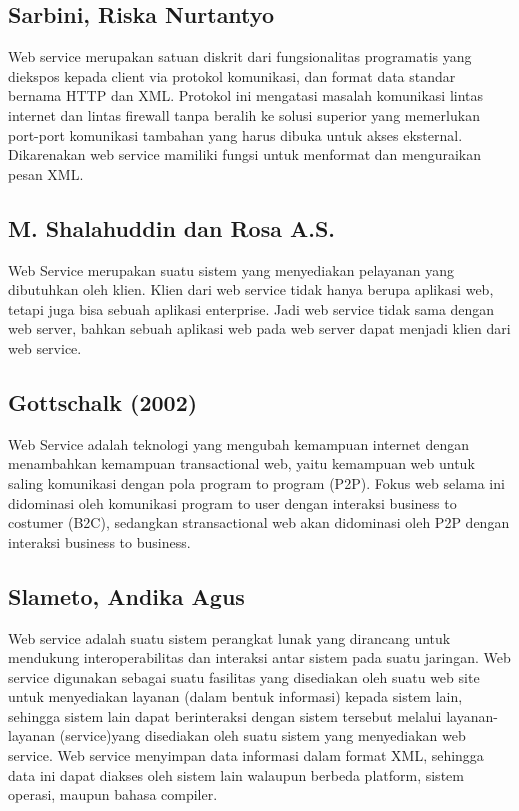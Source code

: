 \documentclass[12pt]{journal}
\begin{document}
\subsection{Sarbini, Riska Nurtantyo}

Web service merupakan satuan diskrit dari fungsionalitas programatis yang diekspos 
kepada client via protokol komunikasi, dan format data standar bernama HTTP dan 
XML. Protokol ini mengatasi masalah komunikasi lintas internet dan lintas 
firewall tanpa beralih ke solusi superior yang memerlukan port-port komunikasi 
tambahan yang harus dibuka untuk akses eksternal. Dikarenakan web service mamiliki fungsi untuk menformat dan menguraikan pesan XML\cite{sarbini2015pengembangan}. 

\subsection{M. Shalahuddin dan Rosa A.S.}

Web Service merupakan suatu sistem yang menyediakan pelayanan yang dibutuhkan oleh klien. Klien dari web service tidak hanya berupa aplikasi web, tetapi juga bisa sebuah aplikasi enterprise. Jadi web service tidak sama dengan web server, bahkan sebuah aplikasi web pada web server dapat menjadi klien dari web service\cite{inayah2014aplikasi}.

\subsection{Gottschalk (2002)}

Web Service adalah teknologi yang mengubah kemampuan internet dengan menambahkan kemampuan transactional web, yaitu kemampuan web untuk saling komunikasi dengan pola program to program (P2P). Fokus web selama ini didominasi oleh komunikasi program to user dengan interaksi business to costumer (B2C), sedangkan stransactional web akan didominasi oleh P2P dengan interaksi business to business\cite{fauziah2014aplikasi}.


\subsection{Slameto, Andika Agus}

Web service adalah suatu sistem perangkat lunak yang dirancang untuk mendukung interoperabilitas dan interaksi antar sistem pada suatu jaringan. Web service digunakan sebagai suatu fasilitas yang disediakan oleh suatu web site untuk menyediakan layanan (dalam bentuk informasi) kepada sistem lain, sehingga sistem lain dapat berinteraksi dengan sistem tersebut melalui layanan-layanan (service)yang disediakan oleh suatu sistem yang menyediakan web service. Web service menyimpan data informasi dalam format XML, sehingga data ini dapat diakses oleh sistem lain walaupun berbeda platform, sistem operasi, maupun bahasa compiler\cite{slameto2015penerapan}.
\end{document}
